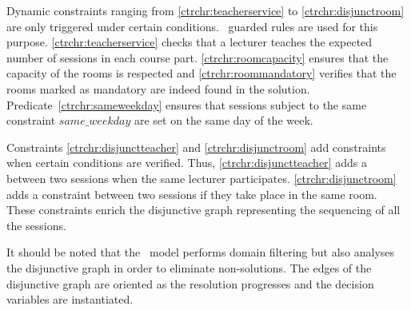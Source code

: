 Dynamic constraints ranging from \ref{ctrchr:teacherservice} to \ref{ctrchr:disjunctroom} are only triggered under certain conditions. \CHR\ guarded rules are used for this purpose. \ref{ctrchr:teacherservice} checks that a lecturer teaches the expected number of sessions in each course part. \ref{ctrchr:roomcapacity} ensures that the capacity of the rooms is respected and \ref{ctrchr:roommandatory} verifies that the rooms marked as mandatory are indeed found in the solution. Predicate~\ref{ctrchr:sameweekday} ensures that sessions subject to the same constraint $same\_weekday$ are set on the same day of the week.

Constraints \ref{ctrchr:disjunctteacher} and \ref{ctrchr:disjunctroom} add constraints when certain conditions are verified. Thus, \ref{ctrchr:disjunctteacher} adds a  between two sessions when the same lecturer participates. \ref{ctrchr:disjunctroom} adds a constraint between two sessions if they take place in the same room. These constraints enrich the disjunctive graph representing the sequencing of all the sessions.

%
%

It should be noted that the \CHR\ model performs domain filtering but also analyses the disjunctive graph in order to eliminate non-solutions. The edges of the disjunctive graph are oriented as the resolution progresses and the decision variables are instantiated. 
